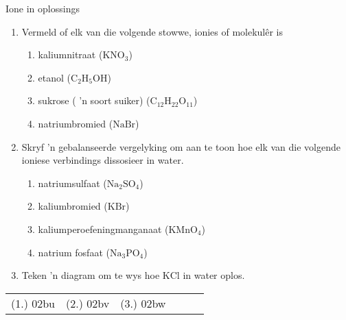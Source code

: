 \begin{exercises}{Ione in oplossings}
{
\begin{enumerate}[noitemsep, label=\textbf{\arabic*}. ] 
\item Vermeld of elk van die volgende stowwe, ionies of molekul\^{e}r is
    \begin{enumerate}[noitemsep, label=\textbf{\alph*}. ] 
    \item kaliumnitraat ($\text{KNO}_{3}$)
    \item etanol ($\text{C}_{2}\text{H}_{5}\text{OH}$)
    \item sukrose ( 'n soort suiker) ($\text{C}_{12}\text{H}_{22}\text{O}_{11}$)
    \item natriumbromied ($\text{NaBr}$)
    \end{enumerate}
\item Skryf 'n gebalanseerde vergelyking om aan te toon hoe elk van die volgende ioniese verbindings dissosieer in water.
    \begin{enumerate}[noitemsep, label=\textbf{\alph*}. ] 
    \item natriumsulfaat ($\text{Na}_{2}\text{SO}_{4}$)
    \item kaliumbromied ($\text{KBr}$)
    \item kaliumperoefeningmanganaat ($\text{KMnO}_{4}$)
    \item natrium fosfaat ($\text{Na}_{3}\text{PO}_{4}$)
    \end{enumerate}
\item Teken 'n diagram om te wys hoe $\text{KCl}$ in water oplos.
\end{enumerate}

\par \practiceinfo
\par \begin{tabular}[h]{cccccc}
(1.)	02bu	&
(2.)	02bv	&
(3.)	02bw	&
\end{tabular}
}
\end{exercises}
